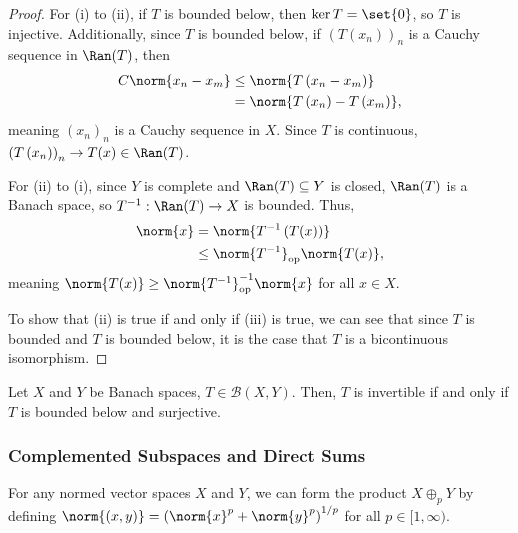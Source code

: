 \documentclass[10pt]{mypackage}
\begin{document}
  \begin{proof}
    For (i) to (ii), if $T$ is bounded below, then $\ker T = \set{0}$, so $T$ is injective. Additionally, since $T$ is bounded below, if $\left(T\left(x_n\right)\right)_n$ is a Cauchy sequence in $\Ran(T)$, then
    \begin{align*}
      C\norm{x_n - x_m} &\leq \norm{T\left(x_n - x_m\right)}\\
                        &= \norm{T\left(x_n\right) - T\left(x_m\right)},
    \end{align*}
    meaning $\left(x_n\right)_n$ is a Cauchy sequence in $X$. Since $T$ is continuous, $\left(T\left(x_n\right)\right)_n \rightarrow T(x)\in \Ran(T)$.\newline

    For (ii) to (i), since $Y$ is complete and $\Ran(T)\subseteq Y$ is closed, $\Ran(T)$ is a Banach space, so $T^{-1}:\Ran(T) \rightarrow X$ is bounded. Thus,
    \begin{align*}
      \norm{x} &= \norm{T^{-1}\left(T(x)\right)}\\
               &\leq \norm{T^{-1}}_{\text{op}}\norm{T(x)},
    \end{align*}
    meaning $\norm{T(x)}\geq \norm{T^{-1}}_{\text{op}}^{-1}\norm{x}$ for all $x\in X$.\newline

    To show that (ii) is true if and only if (iii) is true, we can see that since $T$ is bounded and $T$ is bounded below, it is the case that $T$ is a bicontinuous isomorphism.
  \end{proof}
  \begin{corollary}
    Let $X$ and $Y$ be Banach spaces, $T\in \mathcal{B}\left(X,Y\right)$. Then, $T$ is invertible if and only if $T$ is bounded below and surjective.
  \end{corollary}
  \subsubsection{Complemented Subspaces and Direct Sums}%
  For any normed vector spaces $X$ and $Y$, we can form the product $X\oplus_{p}Y$ by defining $\norm{\left(x,y\right)} = \left(\norm{x}^p + \norm{y}^p\right)^{1/p}$ for all $p\in [1,\infty)$.\newline
\end{document}
